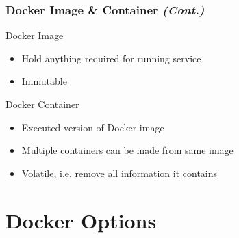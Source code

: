 \documentclass{beamer}
\begin{document}
    \begin{frame}
        \frametitle{Docker Image \& Container \textit{(Cont.)}}

        Docker Image
        \begin{itemize}
            \item Hold anything required for running service
            \item Immutable
        \end{itemize}

        Docker Container
        \begin{itemize}
            \item Executed version of Docker image
            \item Multiple containers can be made from same image
            \item Volatile, i.e. remove all information it contains
        \end{itemize}
    \end{frame}

    \section{Docker Options}
\end{document}
